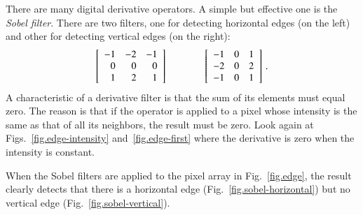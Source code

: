 There are many digital derivative operators. A simple but effective one is the \emph{Sobel filter}. There are two filters, one for detecting horizontal edges (on the left) and other for detecting vertical edges (on the right):
\[
\begin{array}{c@{\hspace{4em}}c}
\left[
\begin{array}{rrr}
-1 & -2 & -1\\
0 & 0 & 0\\
1 & 2 & 1\\
\end{array}
\right]
&
\left[
\begin{array}{rrr}
-1 & 0 & 1\\
-2 & 0 & 2\\
-1 & 0 & 1\\
\end{array}
\right]\,.
\end{array}
\]
A characteristic of a derivative filter is that the sum of its elements must equal zero. The reason is that if the operator is applied to a pixel whose intensity is the same as that of all its neighbors, the result must be zero. Look again at Figs.~\ref{fig.edge-intensity} and~\ref{fig.edge-first} where the derivative is zero when the intensity is constant.

When the Sobel filters are applied to the pixel array in Fig.~\ref{fig.edge}, the result clearly detects that there is a horizontal edge (Fig.~\ref{fig.sobel-horizontal}) but no vertical edge (Fig.~\ref{fig.sobel-vertical}).

